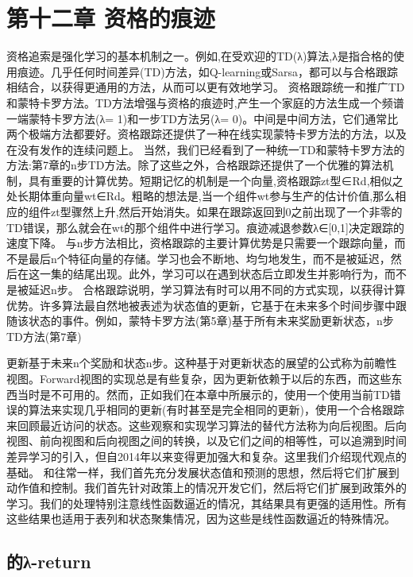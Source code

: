 \chapter{第十二章 资格的痕迹}

\begin{summary}
	资格追索是强化学习的基本机制之一。例如,在受欢迎的TD(λ)算法,λ是指合格的使用痕迹。几乎任何时间差异(TD)方法，如Q-learning或Sarsa，都可以与合格跟踪相结合，以获得更通用的方法，从而可以更有效地学习。
	资格跟踪统一和推广TD和蒙特卡罗方法。TD方法增强与资格的痕迹时,产生一个家庭的方法生成一个频谱一端蒙特卡罗方法(λ= 1)和一步TD方法另(λ= 0)。中间是中间方法，它们通常比两个极端方法都要好。资格跟踪还提供了一种在线实现蒙特卡罗方法的方法，以及在没有发作的连续问题上。
	当然，我们已经看到了一种统一TD和蒙特卡罗方法的方法:第7章的n步TD方法。除了这些之外，合格跟踪还提供了一个优雅的算法机制，具有重要的计算优势。短期记忆的机制是一个向量,资格跟踪zt型∈Rd,相似之处长期体重向量wt∈Rd。粗略的想法是,当一个组件wt参与生产的估计价值,那么相应的组件zt型骤然上升,然后开始消失。如果在跟踪返回到0之前出现了一个非零的TD错误，那么就会在wt的那个组件中进行学习。痕迹减退参数λ∈[0,1]决定跟踪的速度下降。
	与n步方法相比，资格跟踪的主要计算优势是只需要一个跟踪向量，而不是最后n个特征向量的存储。学习也会不断地、均匀地发生，而不是被延迟，然后在这一集的结尾出现。此外，学习可以在遇到状态后立即发生并影响行为，而不是被延迟n步。
	合格跟踪说明，学习算法有时可以用不同的方式实现，以获得计算优势。许多算法最自然地被表述为状态值的更新，它基于在未来多个时间步骤中跟随该状态的事件。例如，蒙特卡罗方法(第5章)基于所有未来奖励更新状态，n步TD方法(第7章)
	
	更新基于未来n个奖励和状态n步。这种基于对更新状态的展望的公式称为前瞻性视图。Forward视图的实现总是有些复杂，因为更新依赖于以后的东西，而这些东西当时是不可用的。然而，正如我们在本章中所展示的，使用一个使用当前TD错误的算法来实现几乎相同的更新(有时甚至是完全相同的更新)，使用一个合格跟踪来回顾最近访问的状态。这些观察和实现学习算法的替代方法称为向后视图。后向视图、前向视图和后向视图之间的转换，以及它们之间的相等性，可以追溯到时间差异学习的引入，但自2014年以来变得更加强大和复杂。这里我们介绍现代观点的基础。
	和往常一样，我们首先充分发展状态值和预测的思想，然后将它们扩展到动作值和控制。我们首先针对政策上的情况开发它们，然后将它们扩展到政策外的学习。我们的处理特别注意线性函数逼近的情况，其结果具有更强的适用性。所有这些结果也适用于表列和状态聚集情况，因为这些是线性函数逼近的特殊情况。
		
\end{summary}


\section{的λ-return}

